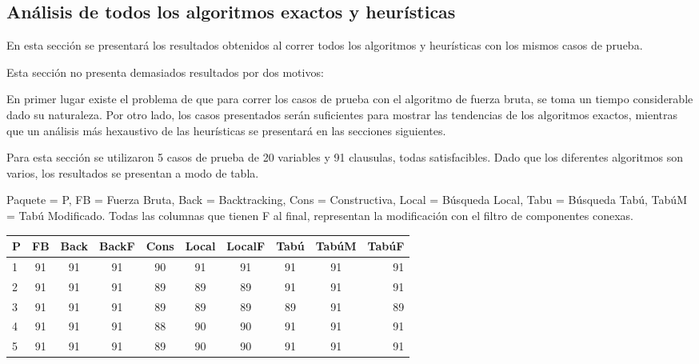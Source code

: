 \documentclass[a4paper,10pt]{article}
\begin{document}
\subsection*{An\'alisis de todos los algoritmos exactos y heur\'isticas}

En esta secci\'on se presentar\'a los resultados obtenidos al correr todos los algoritmos y heur\'isticas con los mismos casos de prueba. 

Esta secci\'on no presenta demasiados resultados por dos motivos:

En primer lugar existe el problema de que para correr los casos de prueba con el algoritmo de fuerza bruta, se toma un tiempo considerable dado su naturaleza. Por otro lado, los casos presentados ser\'an suficientes para mostrar las tendencias de los algoritmos exactos, mientras que un an\'alisis m\'as hexaustivo de las heur\'isticas se presentar\'a en las secciones siguientes.

\medskip

Para esta secci\'on se utilizaron 5 casos de prueba de 20 variables y 91 clausulas, todas satisfacibles. Dado que los diferentes algoritmos son varios, los resultados se presentan a modo de tabla.
\medskip

Paquete = P, FB = Fuerza Bruta, Back = Backtracking, Cons = Constructiva, Local = B\'usqueda Local, Tabu = B\'usqueda Tab\'u, Tab\'uM = Tab\'u Modificado. Todas las columnas que tienen F al final, representan la modificaci\'on con el filtro de componentes conexas.

\medskip


\begin{tabular}{||l|c|c|c|c|c|c|c|c|r||}
\hline
\hline
P & FB & Back & BackF & Cons & Local & LocalF & Tab\'u & Tab\'uM & Tab\'uF\\
\hline
1 & 91 & 91 & 91 & 90 & 91 & 91 & 91 & 91 & 91\\
\hline
2 & 91 & 91 & 91 & 89 & 89 & 89 & 91 & 91 & 91\\
\hline
3 & 91 & 91 & 91 & 89 & 89 & 89 & 89 & 91 & 89\\
\hline
4 & 91 & 91 & 91 & 88 & 90 & 90 & 91 & 91 & 91\\
\hline
5 & 91 & 91 & 91 & 89 & 90 & 90 & 91 & 91 & 91\\
\hline
\hline
\end{tabular}
\end{document}

